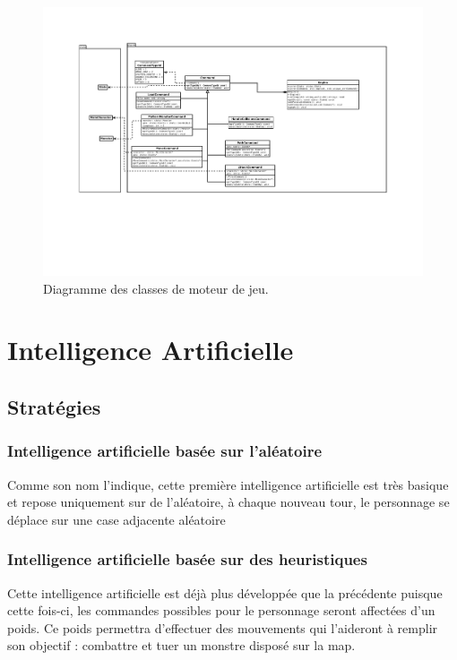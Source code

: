 \documentclass[a4paper,12pt]{article}
\begin{document}
\begin{landscape}
\begin{figure}[p]
\includegraphics[width=0.9\paperheight]{engine.pdf}
\caption{\label{uml:engine}Diagramme des classes de moteur de jeu.} 
\end{figure}
\end{landscape}


\section{Intelligence Artificielle}

\subsection{Stratégies}

\subsubsection{Intelligence artificielle basée sur l'aléatoire}

Comme son nom l'indique, cette première intelligence artificielle est très basique et repose uniquement sur de l'aléatoire, à chaque nouveau tour, le personnage se déplace sur une case adjacente aléatoire

\subsubsection{Intelligence artificielle basée sur des heuristiques}

Cette intelligence artificielle est déjà plus développée que la précédente puisque cette fois-ci, les commandes possibles pour le personnage seront affectées d'un poids. Ce poids permettra d'effectuer des mouvements qui l'aideront à remplir son objectif : combattre et tuer un monstre disposé sur la map.
\end{document}
